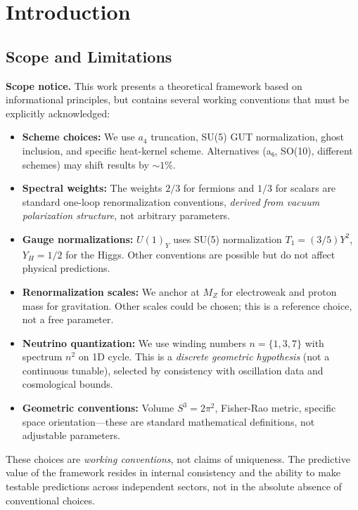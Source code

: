 \documentclass{article}
\numberwithin{equation}{section}
\theoremstyle{plain}
\theoremstyle{definition}
\theoremstyle{remark}
\begin{document}
\vspace{2em}
\tableofcontents
\newpage

\section{Introduction}

\subsection{Scope and Limitations}
\label{sec:scope_limitations}

\textbf{Scope notice.} This work presents a theoretical framework based on informational principles, but contains several working conventions that must be explicitly acknowledged:

\begin{itemize}
\item \textbf{Scheme choices:} We use $a_4$ truncation, SU(5) GUT normalization, ghost inclusion, and specific heat-kernel scheme. Alternatives (a₆, SO(10), different schemes) may shift results by $\sim 1\%$.
\item \textbf{Spectral weights:} The weights $2/3$ for fermions and $1/3$ for scalars are standard one-loop renormalization conventions, \emph{derived from vacuum polarization structure}, not arbitrary parameters.
\item \textbf{Gauge normalizations:} $U(1)_Y$ uses SU(5) normalization $T_1 = (3/5)Y^2$, $Y_H = 1/2$ for the Higgs. Other conventions are possible but do not affect physical predictions.
\item \textbf{Renormalization scales:} We anchor at $M_Z$ for electroweak and proton mass for gravitation. Other scales could be chosen; this is a reference choice, not a free parameter.
\item \textbf{Neutrino quantization:} We use winding numbers $n = \{1,3,7\}$ with spectrum $n^2$ on 1D cycle. This is a \emph{discrete geometric hypothesis} (not a continuous tunable), selected by consistency with oscillation data and cosmological bounds.
\item \textbf{Geometric conventions:} Volume $S^3 = 2\pi^2$, Fisher-Rao metric, specific space orientation—these are standard mathematical definitions, not adjustable parameters.
\end{itemize}

These choices are \emph{working conventions}, not claims of uniqueness. The predictive value of the framework resides in internal consistency and the ability to make testable predictions across independent sectors, not in the absolute absence of conventional choices.
\end{document}
